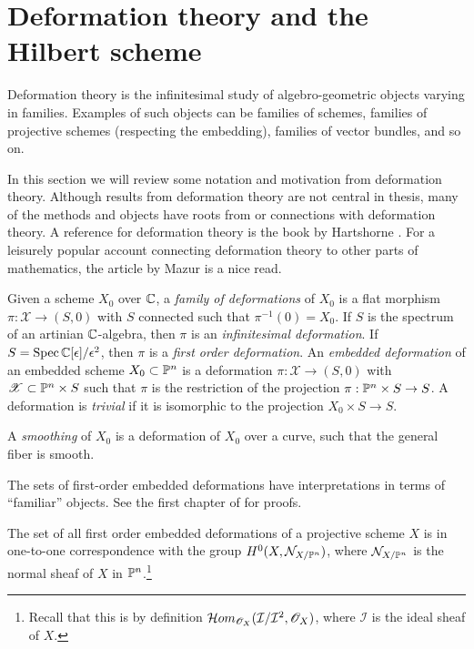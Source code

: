 

\section{Deformation theory and the Hilbert scheme}

Deformation theory is the infinitesimal study of algebro-geometric objects varying in families. Examples of such objects can be families of schemes, families of projective schemes (respecting the embedding), families of vector bundles, and so on.

In this section we will review some notation and motivation from deformation theory. Although results from deformation theory are not central in thesis, many of the methods and objects have roots from or connections with deformation theory. A reference for deformation theory is the book by Hartshorne \cite{hartshorne_deformations}. For a leisurely popular account connecting deformation theory to other parts of mathematics, the article \cite{mazur_deformations} by Mazur is a nice read.

\begin{definition}
Given a scheme $X_0$ over $\C$, a \emph{family of deformations} of $X_0$ is a flat morphism $\pi:\mathscr X \to (S,0)$ with $S$ connected such that $\pi^{-1}(0)=X_0$. If $S$ is the spectrum of an artinian $\C$-algebra, then $\pi$ is an \emph{infinitesimal deformation}. If $S=\Spec \C[\epsilon]/\epsilon^2$, then  $\pi$ is a \emph{first order deformation}. An \emph{embedded deformation} of an embedded scheme $X_0 \subset \P^n$ is a deformation $\pi:\mathscr X \to (S,0)$ with $\mathscr X \subset \P^n \times S$ such that $\pi$ is the restriction of the projection $\pi:\P^n \times S \to S$. A deformation is \emph{trivial} if it is isomorphic to the projection $X_0 \times S \to S$.  

A \emph{smoothing} of $X_0$ is a deformation of $X_0$ over a curve, such that the general fiber is smooth.
\end{definition}

The sets of first-order embedded deformations have interpretations in terms of ``familiar'' objects. See the first chapter of \cite{hartshorne_deformations} for proofs.

\begin{proposition}
The set of all first order embedded deformations of a projective scheme $X$ is in one-to-one correspondence with the group $H^0(X,\mathcal N_{X/\P^n})$, where $\mathcal N_{X/\P^n}$ is the normal sheaf of $X$ in $\P^n$.\footnote{Recall that this is by definition $\mathcal Hom_{\OO_X}(\mathcal I/\mathcal I^2, \OO_X)$, where $\mathcal I$ is the ideal sheaf of $X$.}
\end{proposition}

